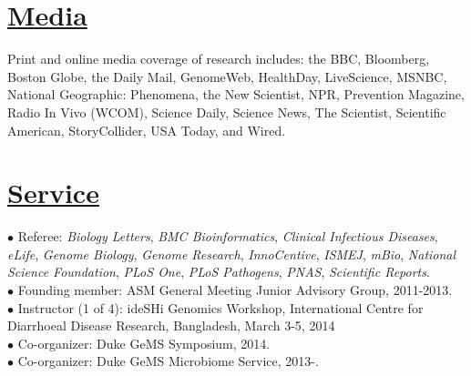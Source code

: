 \documentclass[overlapped,line,11pt]{res}
\begin{document}
\begin{resume}
\begin{itemize}[leftmargin=1cm, style=sameline, itemsep=0mm]
\end{itemize}

\section{\underline{\sc Media}} 
\vspace{.05in} Print and online media coverage of research includes:
the BBC, Bloomberg, Boston Globe, the Daily Mail, GenomeWeb,
HealthDay, LiveScience, MSNBC, National Geographic: Phenomena, the New
Scientist, NPR, Prevention Magazine, Radio In Vivo (WCOM), Science Daily, Science News, The
Scientist, Scientific American, StoryCollider, USA Today, and Wired.


\section{\underline{\sc Service}}
\vspace{.05in}

\hangindent=0.5in $\bullet$\hspace{.1in} Referee:
\emph{Biology Letters}, \emph{BMC Bioinformatics}, \emph{Clinical
  Infectious Diseases}, \emph{eLife}, \emph{Genome Biology}, \emph{Genome
  Research}, \emph{InnoCentive}, \emph{ISMEJ}, \emph{mBio}, \emph{National Science Foundation}, \emph{PLoS One},
\emph{PLoS Pathogens}, \emph{PNAS}, \emph{Scientific Reports}. \\

\vspace{-10mm}
\hangindent=0.5in $\bullet$\hspace{.1in} Founding member: ASM General Meeting
Junior Advisory Group, 2011-2013. \\

\vspace{-10mm}
\hangindent=0.5in $\bullet$\hspace{.1in} Instructor (1 of 4): ideSHi
Genomics Workshop, International Centre for Diarrhoeal
Disease Research, Bangladesh, March 3-5, 2014 \\

\vspace{-10mm}
\hangindent=0.5in $\bullet$\hspace{.1in} Co-organizer: Duke GeMS
Symposium, 2014. \\

\vspace{-10mm}
\hangindent=0.5in $\bullet$\hspace{.1in} Co-organizer: Duke GeMS
Microbiome Service, 2013-. \\


\end{resume}
\end{document}
